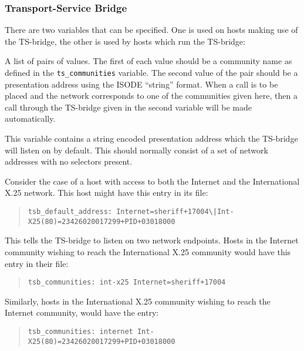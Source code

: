 \subsubsection{Transport-Service Bridge}
There are two variables that can be specified.
One is used on hosts making use of the TS-bridge,
the other is used by hosts which run the TS-bridge:
\begin{describe}
\item[\verb|tsb\_communities|]	A list of pairs of values.
The first of each value should be a community name as defined in
the \verb"ts_communities" variable.
The second value of the pair should be a presentation address using the ISODE
``string'' format.
When a call is to be placed and the network corresponds to one
of the communities given here, then a call through the TS-bridge given in
the second variable will be made automatically.

\item[\verb|tsb\_default\_address|] This variable contains a string encoded
presentation address which the TS-bridge will listen on by default.
This should normally consist of a set of network addresses with no selectors
present.
\end{describe}
Consider the case of a host with access to both the Internet and the
International X.25 network.
This host might have this entry in its  file:
\begin{quote}\tiny\begin{verbatim}
tsb_default_address: Internet=sheriff+17004\|Int-X25(80)=23426020017299+PID+03018000
\end{verbatim}\end{quote}
This tells the TS-bridge to listen on two network endpoints.
Hosts in the Internet community wishing to reach the International
X.25 community would have this entry in their  file:
\begin{quote}\smaller\begin{verbatim}
tsb_communities: int-x25 Internet=sheriff+17004
\end{verbatim}\end{quote}
Similarly,
hosts in the International X.25 community wishing to reach the
Internet community, would have the entry:
\begin{quote}\smaller\begin{verbatim}
tsb_communities: internet Int-X25(80)=23426020017299+PID+03018000
\end{verbatim}\end{quote}

